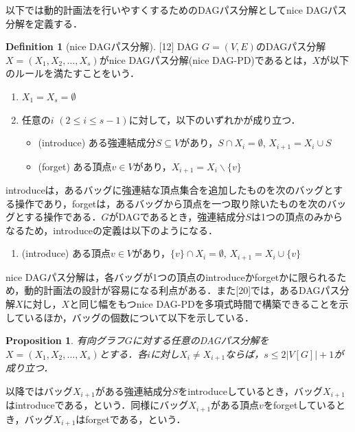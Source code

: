 \documentclass[master]{kuisthesis}		%
\theoremstyle{plain}
\newtheorem{proposition}{Proposition}
\theoremstyle{definition}
\newtheorem{definition*}{Definition}
\begin{document}
以下では動的計画法を行いやすくするためのDAGパス分解としてnice DAGパス分解を定義する．

\begin{definition*}[nice DAGパス分解][12]
    DAG $G=(V, E)$のDAGパス分解$X=(X_1, X_2,  \dots, X_s)$がnice DAGパス分解(nice DAG-PD)であるとは，$X$が以下のルールを満たすことをいう．

    \begin{enumerate}
        \item $X_1 = X_s = \emptyset$
        \item 任意の$i$ $(2 \leq i \leq s-1)$に対して，以下のいずれかが成り立つ．
        \begin{itemize}
            \item (introduce) ある強連結成分$S \subseteq V$があり，$S \cap X_i = \emptyset$, $X_{i+1} = X_i \cup S$
            \item (forget) ある頂点$v \in V$があり，$X_{i+1} = X_i \backslash \{v\}$
        \end{itemize}
    \end{enumerate}

\end{definition*}

introduceは，あるバッグに強連結な頂点集合を追加したものを次のバッグとする操作であり，forgetは，あるバッグから頂点を一つ取り除いたものを次のバッグとする操作である．$G$がDAGであるとき，強連結成分$S$は1つの頂点のみからなるため，introduceの定義は以下のようになる．

\begin{enumerate}
    \item (introduce) ある頂点$v \in V$があり，$\{v\} \cap X_i = \emptyset$, $X_{i+1} = X_i \cup \{v\}$
\end{enumerate}

nice DAGパス分解は，各バッグが1つの頂点のintroduceかforgetかに限られるため，動的計画法の設計が容易になる利点がある．また[20]では，あるDAGパス分解$X$に対し，$X$と同じ幅をもつnice DAG-PDを多項式時間で構築できることを示しているほか，バッグの個数について以下を示している．

\begin{proposition}\label{number_of_bag}
    有向グラフ$G$に対する任意のDAGパス分解を$X=(X_1, X_2, \dots, X_s)$とする．各$i$に対し$X_i \neq X_{i+1}$ならば，$s \leq 2|V[G]|+1$が成り立つ．
\end{proposition}


以降ではバッグ$X_{i+1}$がある強連結成分$S$をintroduceしているとき，バッグ$X_{i+1}$はintroduceである，という．同様にバッグ$X_{i+1}$がある頂点$v$をforgetしているとき，バッグ$X_{i+1}$はforgetである，という．
\end{document}
